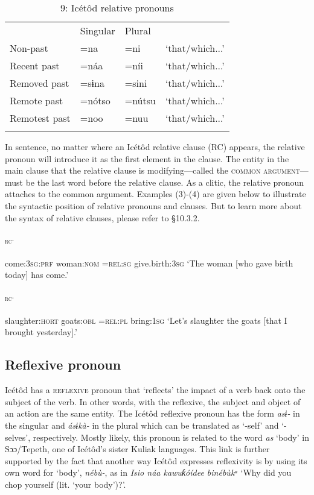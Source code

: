 \begin{table}
\caption{9: Icétôd relative pronouns}
\label{tab:5}


\begin{tabularx}{\textwidth}{XXXX} & Singular & Plural & \\
\lsptoprule
Non-past & =na & =ni & ‘that/which...’\\
Recent past & =náa & =níi & ‘that/which...’\\
Removed past & =sɨna & =sini & ‘that/which...’\\
Remote past & =nótso & =nútsu & ‘that/which...’\\
Remotest past & =noo & =nuu & ‘that/which...’\\
\lspbottomrule
\end{tabularx}
\end{table}
In sentence, no matter where an Icétôd relative clause (RC) appears, the relative pronoun will introduce it as the first element in the clause. The entity in the main clause that the relative clause is modifying—called the \textsc{common argument}—must be the last word before the relative clause. As a clitic, the relative pronoun attaches to the common argument. Examples (3)-(4) are given below to illustrate the syntactic position of relative pronouns and clauses. But to learn more about the syntax of relative clauses, please refer to §10.3.2.




\ea\label{ex:}
\textsc{\textsubscript{rc}}. \\
    \\
come:\textsc{3sg:prf}   woman:\textsc{nom} =\textsc{rel:sg} give.birth:\textsc{3sg}
\glt ‘The woman [who gave birth today] has come.’ 
\z




\ea\label{ex:}
\textsc{\textsubscript{rc}}. \\
    \\
slaughter:\textsc{hort}   goats:\textsc{obl}      =\textsc{rel:pl}   bring:\textsc{1sg}
\glt ‘Let’s slaughter the goats [that I brought yesterday].’ 
\z






\subsection{Reflexive pronoun}


Icétôd has a \textsc{reflexive} pronoun that ‘reflects’ the impact of a verb back onto the subject of the verb. In other words, with the reflexive, the subject and object of an action are the same entity. The Icétôd reflexive pronoun has the form \textit{asɨ-} in the singular and \textit{ásɨkà-} in the plural which can be translated as ‘-self’ and ‘-selves’, respectively. Mostly likely, this pronoun is related to the word \textit{as} ‘body’ in Sɔɔ/Tepeth, one of Icétôd’s sister Kuliak languages. This link is further supported by the fact that another way Icétôd expresses reflexivity is by using its own word for ‘body’, \textit{nébù-}, as in \textit{Isio náa kawuƙóídee binébùkᵃ} ‘Why did you chop yourself (lit. ‘your body’)?’.

